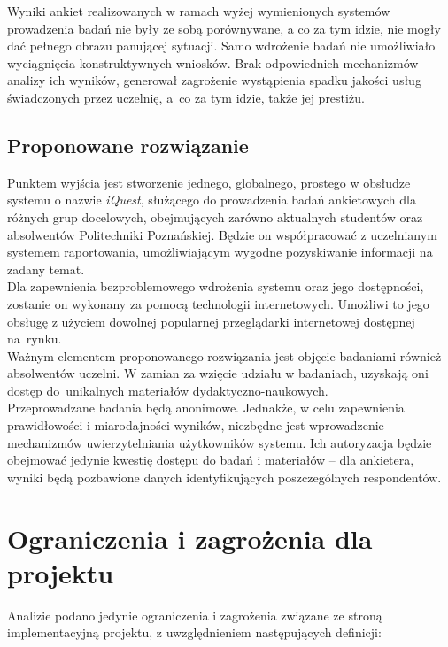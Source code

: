 Wyniki ankiet realizowanych w ramach wyżej wymienionych systemów prowadzenia badań nie były ze sobą porównywane, a co za tym idzie, nie mogły dać pełnego obrazu panującej sytuacji. Samo wdrożenie badań nie umożliwiało wyciągnięcia konstruktywnych wniosków. Brak odpowiednich mechanizmów analizy ich wyników, generował zagrożenie wystąpienia spadku jakości usług świadczonych przez uczelnię, a~co za tym idzie, także jej prestiżu.

\subsection{Proponowane rozwiązanie}
\label{Chapter112}

Punktem wyjścia jest stworzenie jednego, globalnego, prostego w obsłudze systemu o nazwie \textit{iQuest}, służącego do prowadzenia badań ankietowych dla różnych grup docelowych, obejmujących zarówno aktualnych studentów oraz absolwentów Politechniki Poznańskiej. Będzie on współpracować z uczelnianym systemem raportowania, umożliwiającym wygodne pozyskiwanie informacji na zadany temat. \\

Dla zapewnienia bezproblemowego wdrożenia systemu oraz jego dostępności, zostanie on wykonany za pomocą technologii internetowych. Umożliwi to jego obsługę z użyciem dowolnej popularnej przeglądarki internetowej dostępnej na~rynku. \\

Ważnym elementem proponowanego rozwiązania jest objęcie badaniami również absolwentów uczelni. W zamian za wzięcie udziału w badaniach, uzyskają oni dostęp do~unikalnych materiałów dydaktyczno-naukowych. \\

Przeprowadzane badania będą anonimowe. Jednakże, w celu zapewnienia prawidłowości i miarodajności wyników, niezbędne jest wprowadzenie mechanizmów uwierzytelniania użytkowników systemu. Ich autoryzacja będzie obejmować jedynie kwestię dostępu do badań i materiałów -- dla ankietera, wyniki będą pozbawione danych identyfikujących poszczególnych respondentów.

\section{Ograniczenia i zagrożenia dla projektu}
\label{Chapter12}

Analizie podano jedynie ograniczenia i zagrożenia związane ze stroną implementacyjną projektu, z uwzględnieniem następujących definicji:

